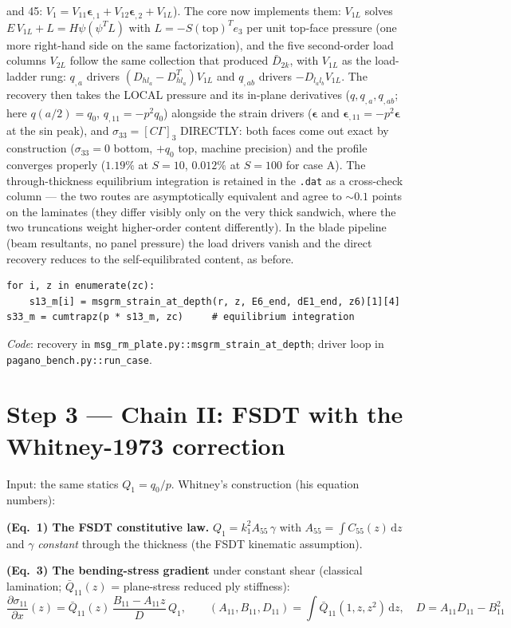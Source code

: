 \documentclass[11pt]{article}
\newcommand{\code}[1]{\texttt{#1}}
\begin{document}
and 45: $V_1 = V_{11}\bm\epsilon_{,1} + V_{12}\bm\epsilon_{,2} + V_{1L}$).  The core
now implements them: $V_{1L}$ solves $E\,V_{1L} + L = H\psi(\psi^TL)$ with
$L = -S(\text{top})^Te_3$ per unit top-face pressure (one more right-hand side on the
same factorization), and the five second-order load columns $V_{2L}$ follow the same
collection that produced $\bar D_{2k}$, with $V_{1L}$ as the load-ladder rung:
$q_{,a}$ drivers $(D_{hl_a}{-}D_{hl_a}^T)V_{1L}$ and $q_{,ab}$ drivers
$-D_{l_al_b}V_{1L}$.  The recovery then takes the LOCAL pressure and its in-plane
derivatives ($q, q_{,a}, q_{,ab}$; here $q(a/2)=q_0$, $q_{,11}=-p^2q_0$) alongside the
strain drivers ($\bm\epsilon$ and $\bm\epsilon_{,11} = -p^2\bm\epsilon$ at the sin
peak), and $\sigma_{33} = [C\Gamma]_3$ DIRECTLY: both faces come out exact by
construction ($\sigma_{33} = 0$ bottom, $+q_0$ top, machine precision) and the profile
converges properly ($1.19\%$ at $S{=}10$, $0.012\%$ at $S{=}100$ for case A).  The
through-thickness equilibrium integration is retained in the \code{.dat} as a
cross-check column --- the two routes are asymptotically equivalent and agree to
$\sim 0.1$ points on the laminates (they differ visibly only on the very thick
sandwich, where the two truncations weight higher-order content differently).  In the
blade pipeline (beam resultants, no panel pressure) the load drivers vanish and the
direct recovery reduces to the self-equilibrated content, as before.
\begin{verbatim}
for i, z in enumerate(zc):
    s13_m[i] = msgrm_strain_at_depth(r, z, E6_end, dE1_end, z6)[1][4]
s33_m = cumtrapz(p * s13_m, zc)     # equilibrium integration
\end{verbatim}
\emph{Code}: recovery in \code{msg\_rm\_plate.py::msgrm\_strain\_at\_depth};
driver loop in \code{pagano\_bench.py::run\_case}.

\section{Step 3 --- Chain II: FSDT with the Whitney-1973 correction}

Input: the same statics $Q_1 = q_0/p$.  Whitney's construction (his equation numbers):

\textbf{(Eq.~1) The FSDT constitutive law.}
$Q_1 = k_1^2 A_{55}\,\gamma$ with $A_{55} = \int C_{55}(z)\,\mathrm dz$ and $\gamma$
\emph{constant} through the thickness (the FSDT kinematic assumption).

\textbf{(Eq.~3) The bending-stress gradient} under constant shear (classical lamination;
$\bar Q_{11}(z)$ = plane-stress reduced ply stiffness):
\begin{equation}
\frac{\partial\sigma_{11}}{\partial x}(z) = \bar Q_{11}(z)\,\frac{B_{11}-A_{11}z}{D}\,Q_1,
\qquad (A_{11},B_{11},D_{11}) = \!\int\! \bar Q_{11}(1,z,z^2)\,\mathrm dz,\quad
D = A_{11}D_{11}-B_{11}^2
\end{equation}
\end{document}

